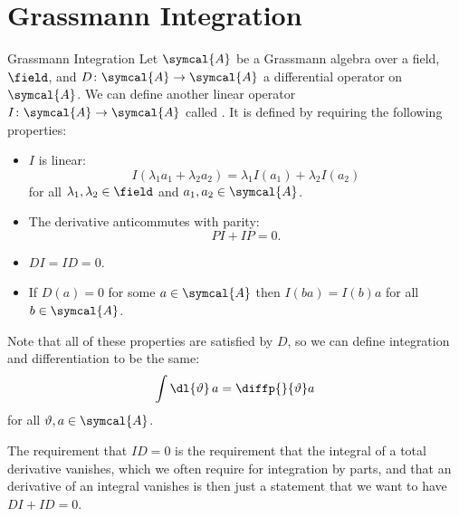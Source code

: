 \section{Grassmann Integration}
\begin{dfn}{Grassmann Integration}{}
    Let \(\symcal{A}\) be a Grassmann algebra over a field, \(\field\), and \(D \colon \symcal{A} \to \symcal{A}\) a differential operator on \(\symcal{A}\).
    We can define another linear operator \(I \colon \symcal{A} \to \symcal{A}\) called .
    It is defined by requiring the following properties:
    \begin{itemize}
        \item \(I\) is linear:
        \begin{equation}
            I(\lambda_1 a_1 + \lambda_2 a_2) = \lambda_1 I(a_1) + \lambda_2 I(a_2)
        \end{equation}
        for all \(\lambda_1, \lambda_2 \in \field\) and \(a_1, a_2 \in \symcal{A}\).
        \item The derivative anticommutes with parity:
        \begin{equation}
            PI + IP = 0.
        \end{equation}
        \item \(DI = ID = 0\).
        \item If \(D(a) = 0\) for some \(a \in \symcal{A}\) then \(I(ba) = I(b)a\) for all \(b \in \symcal{A}\).
    \end{itemize}
    Note that all of these properties are satisfied by \(D\), so we can define integration and differentiation to be the same:
    \begin{equation}
        \int \dl{\vartheta} \, a = \diffp{}{\vartheta}a
    \end{equation}
    for all \(\vartheta, a \in \symcal{A}\).
\end{dfn}

The requirement that \(ID = 0\) is the requirement that the integral of a total derivative vanishes, which we often require for integration by parts, and that an derivative of an integral vanishes is then just a statement that we want to have \(DI + ID = 0\).

